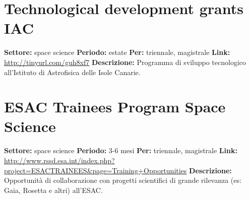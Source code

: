 \documentclass[a4paper,10pt]{article}
\begin{document}
{\section{Technological development grants IAC}
\textbf{Settore:} space science\newline
\textbf{Periodo:} estate\newline
\textbf{Per:} triennale, magistrale\newline
\textbf{Link:} \url{http://tinyurl.com/guh8xf7} \newline
\textbf{Descrizione:} Programma di sviluppo tecnologico all'Istituto di Astrofisica delle Isole Canarie.	

\section{ESAC Trainees Program Space Science}
\textbf{Settore:} space science \newline
\textbf{Periodo:} 3-6 mesi \newline
\textbf{Per:} triennale, magistrale \newline
\textbf{Link:} \url{http://www.rssd.esa.int/index.php?project=ESACTRAINEES&page=Training+Opportunities} \newline
\textbf{Descrizione:} Opportunità di collaborazione con progetti scientifici di grande rilevanza (es: Gaia, Rosetta e altri) all'ESAC.	

}
\end{document}

